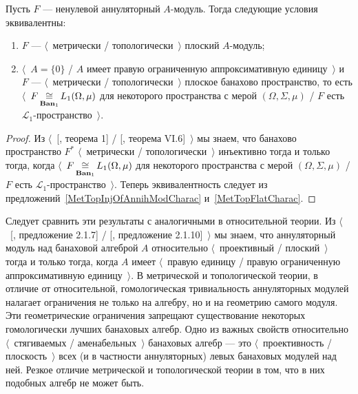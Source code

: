 \begin{proposition}\label{MetTopFlatAnnihModCharac} Пусть $F$ --- ненулевой
аннуляторный $A$-модуль. Тогда следующие условия эквивалентны:
\begin{enumerate}[label = (\roman*)]
    \item $F$ --- $\langle$~метрически / топологически~$\rangle$ плоский
    $A$-модуль;

    \item $\langle$~$A= \{0 \}$ / $A$ имеет правую ограниченную аппроксимативную
    единицу~$\rangle$ и $F$ --- $\langle$~метрически / топологически~$\rangle$
    плоское банахово пространство, то есть
    $\langle$~$F\mathop{\mathbin{\cong}}\limits_{\mathbf{Ban}_1}L_1(\Omega,\mu)$ для некоторого
    пространства с мерой $(\Omega, \Sigma, \mu)$ / $F$ есть
    $\mathscr{L}_1$-пространство~$\rangle$.
\end{enumerate}
\end{proposition}
\begin{proof} Из $\langle$~[\cite{GrothMetrProjFlatBanSp}, теорема 1] /
[\cite{StegRethNucOpL1LInfSp}, теорема VI.6]~$\rangle$ мы знаем, что банахово
пространство $F^*$ $\langle$~метрически / топологически~$\rangle$ инъективно
тогда и только тогда, когда $\langle$~$F\mathop{\mathbin{\cong}}\limits_{\mathbf{Ban}_1}L_1(\Omega,\mu)$
для некоторого пространства с мерой $(\Omega, \Sigma, \mu)$ / $F$ есть
$\mathscr{L}_1$-пространство~$\rangle$. Теперь эквивалентность следует из
предложений~\ref{MetTopInjOfAnnihModCharac} и~\ref{MetTopFlatCharac}.
\end{proof}

Следует сравнить эти результаты с аналогичными в относительной теории. Из
$\langle$~[\cite{RamsHomPropSemgroupAlg}, предложение 2.1.7] /
[\cite{RamsHomPropSemgroupAlg}, предложение 2.1.10]~$\rangle$ мы знаем, что
аннуляторный модуль над банаховой алгеброй $A$  относительно
$\langle$~проективный / плоский~$\rangle$ тогда и только тогда, когда $A$ имеет
$\langle$~правую единицу / правую ограниченную аппроксимативную
единицу~$\rangle$. В метрической и топологической теории, в отличие от
относительной, гомологическая тривиальность аннуляторных модулей налагает
ограничения не только на алгебру, но и на геометрию самого модуля. Эти
геометрические ограничения запрещают существование некоторых гомологически
лучших банаховых алгебр. Одно из важных свойств относительно
$\langle$~стягиваемых / аменабельных~$\rangle$ банаховых алгебр --- это
$\langle$~проективность / плоскость~$\rangle$ всех (и в частности аннуляторных)
левых банаховых модулей над ней. Резкое отличие метрической и топологической
теории в том, что в них подобных алгебр не может быть.

